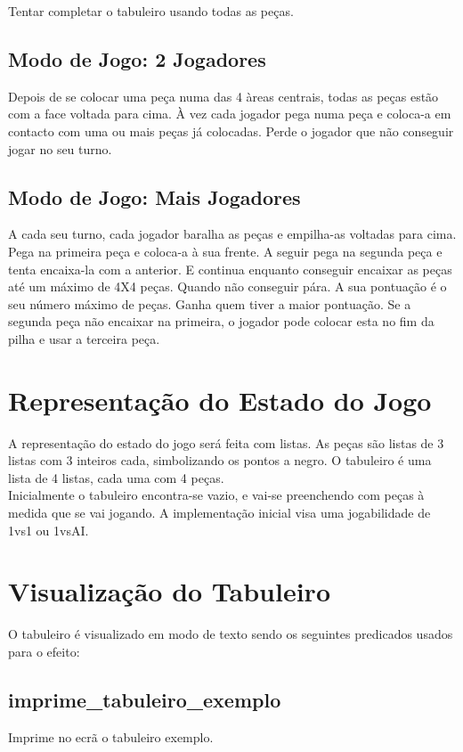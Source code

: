 \documentclass[a4paper]{article}
\begin{document}
Tentar completar o tabuleiro usando todas as peças.

\subsection{Modo de Jogo: 2 Jogadores}

Depois de se colocar uma peça numa das 4 àreas centrais, todas as peças estão com a face voltada para cima. À vez cada jogador pega numa peça e coloca-a em contacto com uma ou mais peças já colocadas. Perde o jogador que não conseguir jogar no seu turno.

\subsection{Modo de Jogo: Mais Jogadores}

A cada seu turno, cada jogador baralha as peças e empilha-as voltadas para cima. Pega na primeira peça e coloca-a à sua frente. A seguir pega na segunda peça e tenta encaixa-la com a anterior. E continua enquanto conseguir encaixar as peças até um máximo de 4X4 peças. Quando não conseguir pára. A sua pontuação é o seu número máximo de peças. Ganha quem tiver a maior pontuação. Se a segunda peça não encaixar na primeira, o jogador pode colocar esta no fim da pilha e usar a terceira peça.

\section{Representação do Estado do Jogo}

A representação do estado do jogo será feita com listas. As peças são listas de 3 listas com 3 inteiros cada, simbolizando os pontos a negro. O tabuleiro é uma lista de 4 listas, cada uma com 4 peças.
\\
\indent 
Inicialmente o tabuleiro encontra-se vazio, e vai-se preenchendo com peças à medida que se vai jogando. A implementação inicial visa uma jogabilidade de 1vs1 ou 1vsAI.

\section{Visualização do Tabuleiro}

O tabuleiro é visualizado em modo de texto sendo os seguintes predicados usados para o efeito:

\subsection{imprime\_tabuleiro\_exemplo}
Imprime no ecrã o tabuleiro exemplo.
\end{document}
